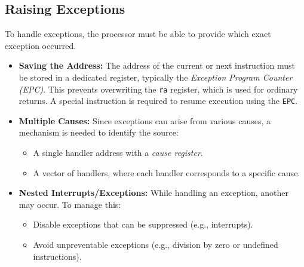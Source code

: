 \subsection{Raising Exceptions}
To handle exceptions, the processor must be able to provide which exact exception occurred. 
\begin{itemize}
    \item[] \textbf{Saving the Address:} The address of the current or next instruction must be stored in a dedicated register, typically the \textit{Exception Program Counter (EPC)}. This prevents overwriting the \texttt{ra} register, which is used for ordinary returns. A special instruction is required to resume execution using the \texttt{EPC}.
    \item[] \textbf{Multiple Causes:} Since exceptions can arise from various causes, a mechanism is needed to identify the source:
    \begin{itemize}
        \item A single handler address with a \textit{cause register}.
        \item A vector of handlers, where each handler corresponds to a specific cause.
    \end{itemize}
    \item[] \textbf{Nested Interrupts/Exceptions:} While handling an exception, another may occur. To manage this:
    \begin{itemize}
        \item Disable exceptions that can be suppressed (e.g., interrupts).
        \item Avoid unpreventable exceptions (e.g., division by zero or undefined instructions).
    \end{itemize}
\end{itemize}

